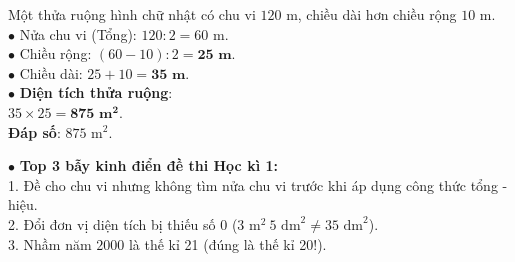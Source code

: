 \documentclass[14pt,a4paper,oneside]{extbook}
\begin{document}
\noindent
\begin{minipage}[t]{0.53\textwidth}
  \begin{tcolorbox}[
    enhanced,
    title={\footnotesize\bfseries\color{white}\faCheckCircle\ Ví dụ thực hành chuẩn mực},
    colback=green!2!white,
    colframe=green!60!black,
    arc=2.5mm, boxrule=0.8pt, top=1.8mm, bottom=1.8mm, left=2.2mm, right=2.2mm
  ]
    \footnotesize
    Một thửa ruộng hình chữ nhật có chu vi $120\text{ m}$, chiều dài hơn chiều rộng $10\text{ m}$.\\
    $\bullet$ Nửa chu vi (Tổng): $120 : 2 = 60\text{ m}$.\\
    $\bullet$ Chiều rộng: $(60 - 10) : 2 = \mathbf{25\text{ m}}$.\\
    $\bullet$ Chiều dài: $25 + 10 = \mathbf{35\text{ m}}$.\\
    $\bullet$ \textbf{Diện tích thửa ruộng}:\\
    $35 \times 25 = \mathbf{875\text{ m}^2}$.\\
    \textbf{Đáp số}: $875\text{ m}^2$.
  \end{tcolorbox}
\end{minipage}%
\hfill
\begin{minipage}[t]{0.45\textwidth}
  \begin{tcolorbox}[
    enhanced,
    title={\footnotesize\bfseries\color{white}\faExclamationTriangle\ Mẹo tránh bẫy trắc nghiệm},
    colback=red!2!white,
    colframe=red!70!black,
    arc=2.5mm, boxrule=0.8pt, top=1.8mm, bottom=1.8mm, left=2.2mm, right=2.2mm
  ]
    \footnotesize
    $\bullet$ \textbf{Top 3 bẫy kinh điển đề thi Học kì 1:}\\
    1. Đề cho chu vi nhưng không tìm nửa chu vi trước khi áp dụng công thức tổng - hiệu.\\
    2. Đổi đơn vị diện tích bị thiếu số $0$ ($3\text{ m}^2\ 5\text{ dm}^2 \ne 35\text{ dm}^2$).\\
    3. Nhầm năm $2000$ là thế kỉ 21 (đúng là thế kỉ 20!).
  \end{tcolorbox}
\end{minipage}
\end{document}
